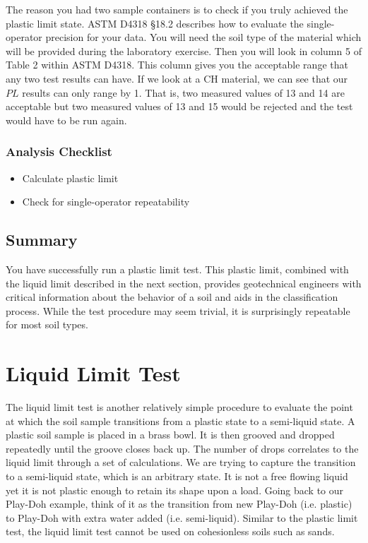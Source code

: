 \documentclass[12pt]{article}
\begin{document}
The reason you had two sample containers is to check if you truly achieved the plastic limit state. ASTM D4318 \S18.2 describes how to evaluate the single-operator precision for your data. You will need the soil type of the material which will be provided during the laboratory exercise. Then you will look in column 5 of Table 2 within ASTM D4318. This column gives you the acceptable range that any two test results can have. If we look at a CH material, we can see that our $PL$ results can only range by 1. That is, two measured values of 13 and 14 are acceptable but two measured values of 13 and 15 would be rejected and the test would have to be run again.
\subsubsection*{Analysis Checklist}
\begin{itemize}
    \item Calculate plastic limit
    \item Check for single-operator repeatability
\end{itemize}

\subsection{Summary}
You have successfully run a plastic limit test. This plastic limit, combined with the liquid limit described in the next section, provides geotechnical engineers with critical information about the behavior of a soil and aids in the classification process. While the test procedure may seem trivial, it is surprisingly repeatable for most soil types.

\pagebreak
\section{Liquid Limit Test}
The liquid limit test is another relatively simple procedure to evaluate the point at which the soil sample transitions from a plastic state to a semi-liquid state. A plastic soil sample is placed in a brass bowl. It is then grooved and dropped repeatedly until the groove closes back up. The number of drops correlates to the liquid limit through a set of calculations. We are trying to capture the transition to a semi-liquid state, which is an arbitrary state. It is not a free flowing liquid yet it is not plastic enough to retain its shape upon a load. Going back to our Play-Doh\textregistered{} example, think of it as the transition from new Play-Doh\textregistered{} (i.e. plastic) to Play-Doh\textregistered{} with extra water added (i.e. semi-liquid). Similar to the plastic limit test, the liquid limit test cannot be used on cohesionless soils such as sands.
\end{document}
